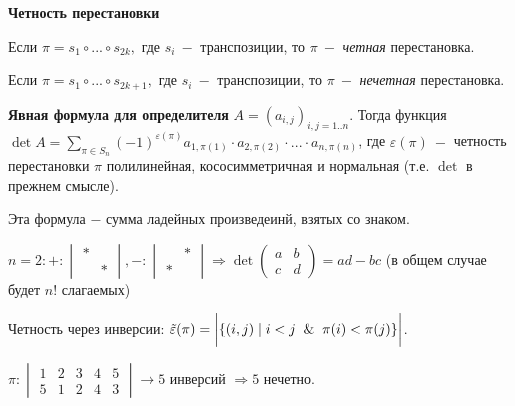 \begin{definition}
    \textbf{Четность перестановки}

    Если $\pi=s_1\circ ...\circ s_{2k},$ где $ s_i\ -$ транспозиции, то $\pi\ -$ \textit{четная} перестановка.

    Если $\pi=s_1\circ ...\circ s_{2k+1},$ где $ s_i\ -$ транспозиции, то $\pi\ -$ \textit{нечетная} перестановка.
\end{definition}

\begin{theorem}
    \textbf{Явная формула для определителя}
    $A=(a_{i,j})_{i,j=1..n}$. Тогда функция $\det A=\sum\limits_{\pi\in S_n}(-1)^{\varepsilon(\pi)}a_{1,\pi(1)}\cdot a_{2,\pi(2)}\cdot...\cdot a_{n,\pi(n)}$, где $\varepsilon(\pi)\ -$ четность перестановки $\pi$ полилинейная, кососимметричная и нормальная (т.е. $\det$ в прежнем смысле).
\end{theorem}

\begin{remark}
    Эта формула $-$ сумма ладейных произведеинй, взятых со знаком.
\end{remark}

\begin{example}
    $n=2:+: \begin{vmatrix} * &  \\ & *
    \end{vmatrix}, -: \begin{vmatrix} & *   \\ * &
    \end{vmatrix}\Rightarrow \det \begin{pmatrix}
                                      a & b  \\ c & d
    \end{pmatrix}=ad-bc$ (в общем случае будет $n!$ слагаемых)
\end{example}

\begin{definition}
    Четность через инверсии: $\Tilde{\varepsilon}(\pi)=\bigg|\{(i,j)\mid i<j \And \pi(i)<\pi(j)\}\bigg|$.
\end{definition}

\begin{example}
    $\pi:\begin{vmatrix} 1 & 2 & 3 & 4 & 5 \\ 5 & 1 & 2 & 4 & 3
    \end{vmatrix}\rightarrow 5$ инверсий $\Rightarrow 5$ нечетно.
\end{example}

